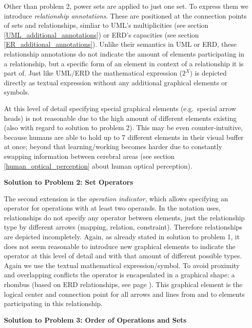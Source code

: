 \documentclass[twoside, openright, 12pt]{book}
\begin{document}
\noindent
Other than problem 2, power sets are applied to just one set.
To express them we introduce \textit{relationship annotations}.
These are positioned at the connection points of sets and relationships, simliar to UML's multiplicities (see section \ref{UML_additional_annotations}) or ERD's capacities (see section \ref{ER_additional_annotations}).
Unlike their semantics in UML or ERD, these relationship annotations do not indicate the amount of elements participating in a relationship, but a specific form of an element in context of a relationship it is part of.
Just like UML/ERD the mathematical expression ($2^X$) is depicted directly as textual expression without any additional graphical elements or symbols.

At this level of detail specifying special graphical elements (e.g.~special arrow heads) is not reasonable due to the high amount of different elements existing (also with regard to solution to problem 2).
This may be even counter-intuitive, because humans are able to hold up to 7 different elements in their visual buffer at once; beyond that learning/working becomes harder due to constantly swapping information between cerebral areas (see section \ref{human_optical_perception} about human optical perception).

\vspace{2mm}
\noindent
\textbf{Solution to Problem 2: Set Operators}
\vspace{1mm}

\noindent
The second extension is the \textit{operation indicator}, which allows specifying an operator for operations with at least two operands.
In the notation \cite{Amthor18} uses, relationships do not specify any operator between elements, just the relationship type by different arrows (mapping, relation, constraint).
Therefore relationships are depicted incompletely.
Again, as already stated in solution to problem 1, it does not seem reasonable to introduce new graphical elements to indicate the operator at this level of detail and with that amount of different possible types.
Again we use the textual mathematical expression/symbol.
To avoid proximity and overlapping conflicts the operator is encapsulated in a graphical shape: a rhombus (based on ERD relationships, see page \pageref{fig:ERD_relationship}).
This graphical element is the logical center and connection point for all arrows and lines from and to elements participating in this relationship.



\vspace{2mm}
\noindent
\textbf{Solution to Problem 3: Order of Operations and Sets}
\vspace{1mm}
\end{document}
